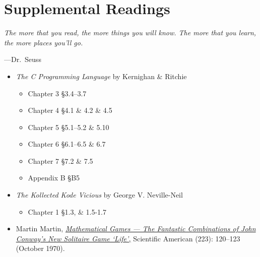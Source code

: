 \section{Supplemental Readings}

\epigraph{\emph{The more that you read, the more things you will know. The
more that you learn, the more places you'll go.}}{---Dr.\ Seuss}\noindent

\begin{itemize}
  \item \textit{The C Programming Language} by Kernighan \& Ritchie
    \begin{itemize}
      \item Chapter 3 \S 3.4--3.7
      \item Chapter 4 \S 4.1 \& 4.2 \& 4.5
      \item Chapter 5 \S 5.1--5.2 \& 5.10
      \item Chapter 6 \S 6.1--6.5 \& 6.7
      \item Chapter 7 \S 7.2 \& 7.5
      \item Appendix B \S B5
    \end{itemize}

  \item \textit{The Kollected Kode Vicious } by George V. Neville-Neil
  \begin{itemize}
      \item Chapter 1 \S 1.3, \& 1.5-1.7
  \end{itemize}

  \item  Martin Martin,
    \href{https://web.stanford.edu/class/sts145/Library/life.pdf}{\emph{Mathematical
    Games --- The Fantastic Combinations of John Conway's New Solitaire Game
    `Life',}} Scientific American (223): 120--123 (October 1970).
\end{itemize}

